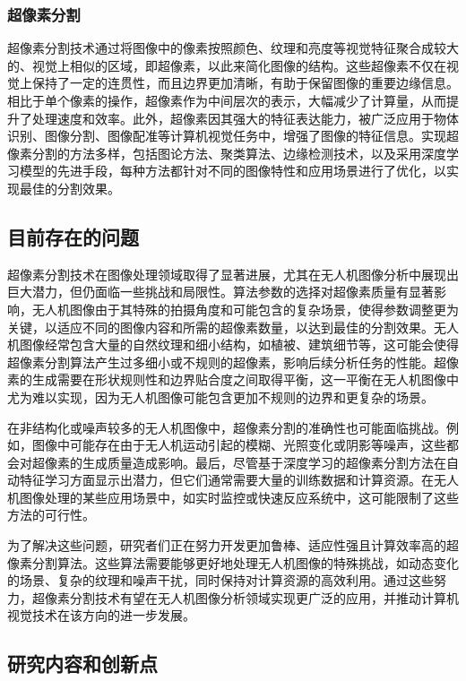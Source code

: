 \subsubsection{超像素分割}
超像素分割技术通过将图像中的像素按照颜色、纹理和亮度等视觉特征聚合成较大的、视觉上相似的区域，即超像素，以此来简化图像的结构。这些超像素不仅在视觉上保持了一定的连贯性，而且边界更加清晰，有助于保留图像的重要边缘信息。相比于单个像素的操作，超像素作为中间层次的表示，大幅减少了计算量，从而提升了处理速度和效率。此外，超像素因其强大的特征表达能力，被广泛应用于物体识别、图像分割、图像配准等计算机视觉任务中，增强了图像的特征信息。实现超像素分割的方法多样，包括图论方法、聚类算法、边缘检测技术，以及采用深度学习模型的先进手段，每种方法都针对不同的图像特性和应用场景进行了优化，以实现最佳的分割效果。

\subsection{目前存在的问题}
超像素分割技术在图像处理领域取得了显著进展，尤其在无人机图像分析中展现出巨大潜力，但仍面临一些挑战和局限性。算法参数的选择对超像素质量有显著影响，无人机图像由于其特殊的拍摄角度和可能包含的复杂场景，使得参数调整更为关键，以适应不同的图像内容和所需的超像素数量，以达到最佳的分割效果。无人机图像经常包含大量的自然纹理和细小结构，如植被、建筑细节等，这可能会使得超像素分割算法产生过多细小或不规则的超像素，影响后续分析任务的性能。超像素的生成需要在形状规则性和边界贴合度之间取得平衡，这一平衡在无人机图像中尤为难以实现，因为无人机图像可能包含更加不规则的边界和更复杂的场景。\cite{JSJA2023S1052}

在非结构化或噪声较多的无人机图像中，超像素分割的准确性也可能面临挑战。例如，图像中可能存在由于无人机运动引起的模糊、光照变化或阴影等噪声，这些都会对超像素的生成质量造成影响。最后，尽管基于深度学习的超像素分割方法在自动特征学习方面显示出潜力，但它们通常需要大量的训练数据和计算资源。在无人机图像处理的某些应用场景中，如实时监控或快速反应系统中，这可能限制了这些方法的可行性。

为了解决这些问题，研究者们正在努力开发更加鲁棒、适应性强且计算效率高的超像素分割算法。这些算法需要能够更好地处理无人机图像的特殊挑战，如动态变化的场景、复杂的纹理和噪声干扰，同时保持对计算资源的高效利用。通过这些努力，超像素分割技术有望在无人机图像分析领域实现更广泛的应用，并推动计算机视觉技术在该方向的进一步发展。

\subsection{研究内容和创新点}
